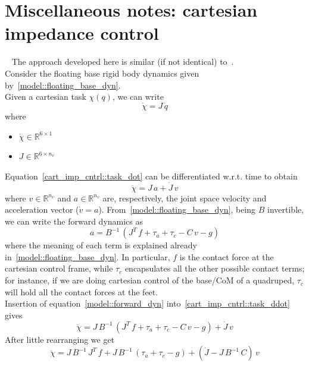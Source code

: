 \documentclass[letterpaper, 10 pt, conference]{ieeeconf}  %
\begin{document}
\section{Miscellaneous notes: cartesian impedance control}\label{section::cartesian_impedance_cntrl}
~\cite{cart_imp::hogan1984impedance}
The approach developed here is similar (if not identical) to~\cite{cart_imp::ficuciello2015variable}.\\
Consider the floating base rigid body dynamics given by~\eqref{model::floating_base_dyn}.\\
Given a cartesian task $\chi(q)$, we can write
\begin{equation}\label{cart_imp_cntrl::task_dot}
\dot{\chi} = J\,\dot{q}
\end{equation}
where
\begin{itemize}
	\item $\dot{\chi}\in\mathbb{R}^{6\times 1}$
	\item $J\in\mathbb{R}^{6\times n_v}$
\end{itemize}
Equation~\eqref{cart_imp_cntrl::task_dot} can be differentiated w.r.t. time to obtain
\begin{equation}\label{cart_imp_cntrl::task_ddot}
\ddot{\chi} = J\,a + \dot{J}\,v
\end{equation}
where $v\in\mathbb{R}^{n_v}$ and $a\in\mathbb{R}^{n_v}$ are, respectively, the joint space velocity and acceleration vector ($\dot{v} = a$).
From~\eqref{model::floating_base_dyn}, being $B$ invertible, we can write the forward dynamics as
\begin{equation}\label{model::forward_dyn}
a = B^{-1}\,\left(J^T\,f + \tau_a + \tau_c - C\,v - g\right)
\end{equation}
where the meaning of each term is explained already in~\eqref{model::floating_base_dyn}. In particular, $f$ is the contact force at the cartesian control frame, while $\tau_c$ encapsulates all the other possible contact terms; for instance, if we are doing cartesian control of the base/CoM of a quadruped, $\tau_c$ will hold all the contact forces at the feet.\\
Insertion of equation~\eqref{model::forward_dyn} into~\eqref{cart_imp_cntrl::task_ddot} gives
\begin{equation}\label{cart_imp_cntrl::task_dyn_raw}
\ddot{\chi} = J\,B^{-1}\,\left(J^T\,f + \tau_a + \tau_c - C\,v - g\right) + \dot{J}\,v
\end{equation}
After little rearranging we get
\begin{equation}\label{cart_imp_cntrl::task_forward_dyn}
\ddot{\chi} = J\,B^{-1}\,J^T\,f + J\,B^{-1}\,\left(\tau_a + \tau_c - g\right) +\left(\dot{J} - J\,B^{-1}\,C\right)\,v
\end{equation}
\end{document}
